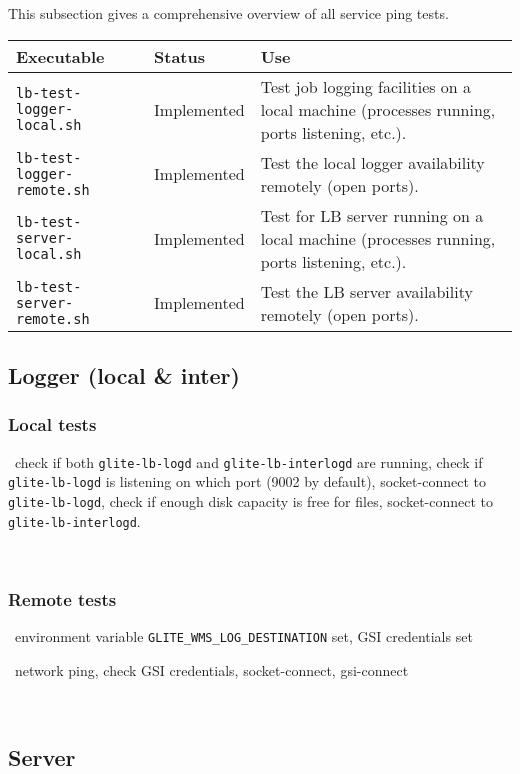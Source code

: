 This subsection gives a comprehensive overview of all service ping tests.

\begin{tabularx}{\textwidth}{|l|l|X|}
\hline
     {\bf Executable} & {\bf Status} & {\bf Use} \\
\hline
{\tt lb-test-logger-local.sh} & Implemented & Test job logging facilities on a local machine (processes running, ports listening, etc.). \\
\hline
{\tt lb-test-logger-remote.sh} & Implemented & Test the local logger availability remotely (open ports). \\
\hline
{\tt lb-test-server-local.sh} & Implemented & Test for LB server running on a local machine (processes running, ports listening, etc.). \\
\hline
{\tt lb-test-server-remote.sh} & Implemented & Test the LB server availability remotely (open ports). \\
\hline
\end{tabularx}

\subsection{Logger (local \& inter)}

\subsubsection{Local tests}
\what\ check if both \texttt{glite-lb-logd} and \texttt{glite-lb-interlogd} are running,
check if \texttt{glite-lb-logd} is listening on which port (9002 by default),
socket-connect to \texttt{glite-lb-logd},
check if enough disk capacity is free for  files,
socket-connect to \texttt{glite-lb-interlogd}.

\how\ 


\subsubsection{Remote tests}
\req\ environment variable \texttt{GLITE\_WMS\_LOG\_DESTINATION} set, GSI credentials set

\what\ network ping,
check GSI credentials,
socket-connect,
gsi-connect

\how\ 


\subsection{Server}

